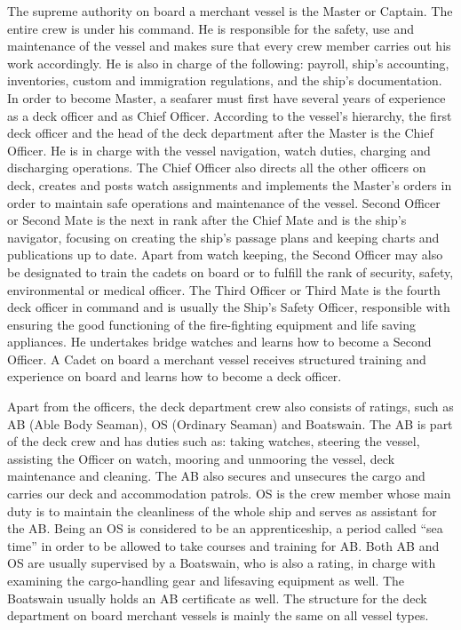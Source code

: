 The supreme authority on board a merchant vessel is the Master or Captain. The entire crew is under his command. He is responsible for the safety, use and maintenance of the vessel and makes sure that every crew member carries out his work accordingly. He is also in charge of the following: payroll, ship’s accounting, inventories, custom and immigration regulations, and the ship’s documentation. In order to become Master, a seafarer must first have several years of experience as a deck officer and as Chief Officer.
According to the vessel’s hierarchy, the first deck officer and the head of the deck department after the Master is the Chief Officer. He is in charge with the vessel navigation, watch duties, charging and discharging operations. The Chief Officer also directs all the other officers on deck, creates and posts watch assignments and implements the Master’s orders in order to maintain safe operations and maintenance of the vessel.
Second Officer or Second Mate is the next in rank after the Chief Mate and is the ship’s navigator, focusing on creating the ship’s passage plans and keeping charts and publications up to date. Apart from watch keeping, the Second Officer may also be designated to train the cadets on board or to fulfill the rank of security, safety, environmental or medical officer.
The Third Officer or Third Mate is the fourth deck officer in command and is usually the Ship’s Safety Officer, responsible with ensuring the good functioning of the fire-fighting equipment and life saving appliances. He undertakes bridge watches and learns how to become a Second Officer.
A Cadet on board a merchant vessel receives structured training and experience on board and learns how to become a deck officer.

Apart from the officers, the deck department crew also consists of ratings, such as AB (Able Body Seaman), OS (Ordinary Seaman) and Boatswain.
The AB is part of the deck crew and has duties such as: taking watches, steering the vessel, assisting the Officer on watch, mooring and unmooring the vessel, deck maintenance and cleaning. The AB also secures and unsecures the cargo and carries our deck and accommodation patrols.
OS is the crew member whose main duty is to maintain the cleanliness of the whole ship and serves as assistant for the AB. Being an OS is considered to be an apprenticeship, a period called “sea time” in order to be allowed to take courses and training for AB.
Both AB and OS are usually supervised by a Boatswain, who is also a rating, in charge with examining the cargo-handling gear and lifesaving equipment as well. The Boatswain usually holds an AB certificate as well.
The structure for the deck department on board merchant vessels is mainly the same on all vessel types. \cite{Nedcon2013}

